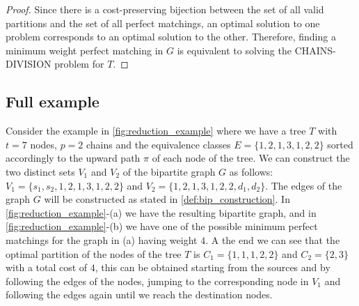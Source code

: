 \begin{proof}
    Since there is a cost-preserving bijection between the set of all valid partitions and the set of all perfect matchings, an optimal solution to one problem corresponds to an optimal solution to the other. Therefore, finding a minimum weight perfect matching in $G$ is equivalent to solving the \textsc{CHAINS-DIVISION} problem for $T$.
\end{proof}

\subsection{Full example}
Consider the example in \cref{fig:reduction_example} where we have a tree $T$ with $t=7$ nodes, $p = 2$ chains and the equivalence classes $E = \{1,2,1,3,1,2,2\}$ sorted accordingly to the upward path $\pi$ of each node of the tree. We can construct the two distinct sets $V_1$ and $V_2$ of the bipartite graph $G$ as follows: $V_1 = \{s_1, s_2, 1,2,1,3,1,2,2\}$ and $V_2 = \{1,2,1,3,1,2,2, d_1, d_2\}$. The edges of the graph $G$ will be constructed as stated in \cref{def:bip_construction}. In \cref{fig:reduction_example}-(a) we have the resulting bipartite graph, and in \cref{fig:reduction_example}-(b) we have one of the possible minimum perfect matchings for the graph in (a) having weight $4$. A the end we can see that the optimal partition of the nodes of the tree $T$ is $C_1 = \{1,1,1,2,2\}$ and $C_2 = \{2,3\}$ with a total cost of $4$, this can be obtained starting from the sources and by following the edges of the nodes, jumping to the corresponding node in $V_1$ and following the edges again until we reach the destination nodes.

